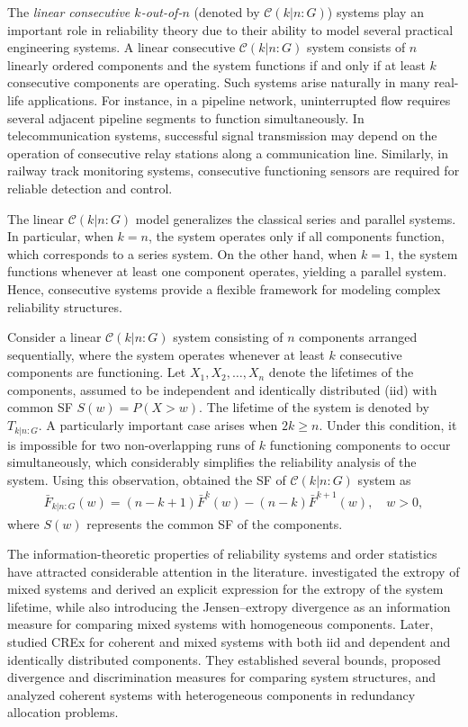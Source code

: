 \documentclass[12pt,a4paper]{article}
\numberwithin{equation}{section}
\begin{document}
The \emph{linear consecutive $k$-out-of-$n$} (denoted by $\mathcal C(k|n{:}G)$) systems play an important role in reliability theory due to their ability to model several practical engineering systems. A linear consecutive $\mathcal C(k|n{:}G)$ system consists of $n$ linearly ordered components and the system functions if and only if at least $k$ consecutive components are operating. Such systems arise naturally in many real-life applications. For instance, in a pipeline network, uninterrupted flow requires several adjacent pipeline segments to function simultaneously. In telecommunication systems, successful signal transmission may depend on the operation of consecutive relay stations along a communication line. Similarly, in railway track monitoring systems, consecutive functioning sensors are required for reliable detection and control.

The linear $\mathcal C(k|n{:}G)$ model generalizes the classical series and parallel systems. In particular, when $k=n$, the system operates only if all components function, which corresponds to a series system. On the other hand, when $k=1$, the system functions whenever at least one component operates, yielding a parallel system. Hence, consecutive systems provide a flexible framework for modeling complex reliability structures.

Consider a linear $\mathcal C(k|n{:}G)$ system consisting of $n$ components arranged sequentially, where the system operates whenever at least $k$ consecutive components are functioning. Let $X_1,X_2,\ldots,X_n$ denote the lifetimes of the components, assumed to be independent and identically distributed (iid) with common SF $S(w)=P(X>w)$. The lifetime of the system is denoted by $T_{k|n:G}$. A particularly important case arises when $2k\geq n$. Under this condition, it is impossible for two non-overlapping runs of $k$ functioning components to occur simultaneously, which considerably simplifies the reliability analysis of the system. Using this observation, \cite{ery2009} obtained the SF of $\mathcal C(k|n{:}G)$ system as
\begin{align}\label{eq1.3}
    \bar F_{k|n:G}(w)
    =
    (n-k+1)\bar F^{k}(w)
    -
    (n-k)\bar F^{k+1}(w),
    \quad w>0,
\end{align}
where $S(w)$ represents the common SF of the components.

The information-theoretic properties of reliability systems and order statistics have attracted considerable attention in the literature. \cite{qiu2019} investigated the extropy of mixed systems and derived an explicit expression for the extropy of the system lifetime, while also introducing the Jensen--extropy divergence as an information measure for comparing mixed systems with homogeneous components. Later, \cite{chak2024} studied CREx for coherent and mixed systems with both iid  and dependent and identically distributed  components. They established several bounds, proposed divergence and discrimination measures for comparing system structures, and analyzed coherent systems with heterogeneous components in redundancy allocation problems.
\end{document}
